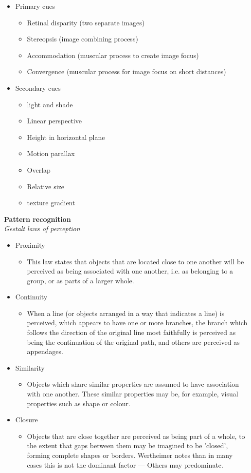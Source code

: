 \begin{itemize}
	\item Primary cues
	\begin{itemize}
		\item Retinal disparity (two separate images)
		\item Stereopsis (image combining process)
		\item Accommodation (muscular process to create image focus)
		\item Convergence (muscular process for image focus on short distances)
	\end{itemize}
	\item Secondary cues
	\begin{itemize}
		\item light and shade
		\item Linear perspective
		\item Height in horizontal plane
		\item Motion parallax
		\item Overlap
		\item Relative size
		\item texture gradient
	\end{itemize}
\end{itemize}
\textbf{Pattern recognition}\\
\textit{Gestalt laws of perception}
\begin{itemize}
	\item Proximity
	\begin{itemize}
		\item This law states that objects that are located close to one another will be perceived as being associated with one another, i.e. as belonging to a group, or as parts of a larger whole.
	\end{itemize}
	\item Continuity
	\begin{itemize}
		\item When a line (or objects arranged in a way that indicates a line) is perceived, which appears to have one or more branches, the branch which follows the direction of the original line most faithfully is perceived as being the continuation of the original path, and others are perceived as appendages.
	\end{itemize}
	\item Similarity
	\begin{itemize}
		\item Objects which share similar properties are assumed to have association with one another. These similar properties may be, for example, visual properties such as shape or colour. 
	\end{itemize}
	\item Closure
	\begin{itemize}
		\item Objects that are close together are perceived as being part of a whole, to the extent that gaps between them may be imagined to be 'closed', forming complete shapes or borders. Wertheimer notes than in many cases this is not the dominant factor --- Others may predominate. 
	\end{itemize}
	
\end{itemize}